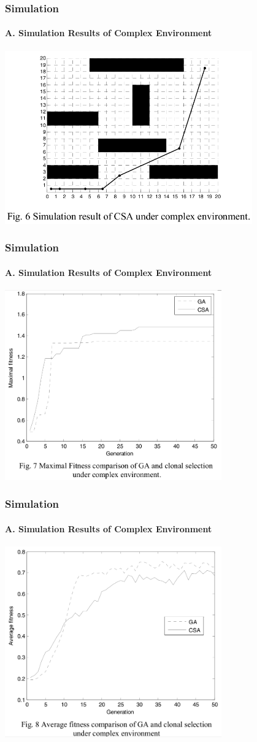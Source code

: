 \frame
{
\frametitle{Simulation}
\framesubtitle{A. Simulation Results of Complex Environment}
\begin{center}
	\includegraphics[width=0.8\textwidth]{img/csaresult}
\end{center}
}
\frame
{
\frametitle{Simulation}
\framesubtitle{A. Simulation Results of Complex Environment}
\begin{center}
	\includegraphics[width=0.7\textwidth]{img/maximal}
\end{center}
}
\frame
{
\frametitle{Simulation}
\framesubtitle{A. Simulation Results of Complex Environment}
\begin{center}
	\includegraphics[width=0.7\textwidth]{img/average}
\end{center}
}

